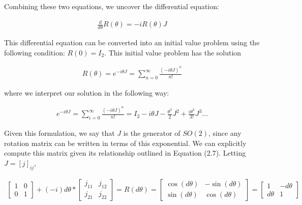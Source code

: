\documentclass[10pt]{ucthesis}
\begin{document}
Combining these two equations, we uncover the differential equation:

\begin{equation}
	\begin{aligned}
		\frac{d}{d\theta}R(\theta) = - i R(\theta)J
	\end{aligned}
\end{equation}  

This differential equation can be converted into an initial value problem using the following condition: $R(0) = I_2$. This initial value problem has the solution

\begin{equation}
	\begin{aligned}
		R(\theta) = e^{-i\theta J} = \sum_{n=0}^\infty \frac{(-i\theta J)^n}{n!}
	\end{aligned}
\end{equation}  

\noindent where we interpret our solution in the following way:

\begin{equation}
	\begin{aligned}
		e^{-i\theta J} = \sum_{i=0}^\infty \frac{\left(-i\theta J\right)^n}{n!} = I_2 -i\theta J - \frac{\theta^2}{2} J^2 + \frac{i\theta^3}{3!}J^3 \hdots 
	\end{aligned}
\end{equation}  

Given this formulation, we say that $J$ is the generator of $SO(2)$, since any rotation matrix can be written in terms of this exponential. We can explicitly compute this matrix given its relationship outlined in Equation (2.7). Letting $J = [j]_{ij}$,

\begin{equation}
	\begin{aligned}
		\begin{bmatrix}
			1 & 0 \\
			0 & 1
		\end{bmatrix} + (-i)d\theta * \begin{bmatrix}
			j_{11} & j_{12} \\
			j_{21} & j_{22}
		\end{bmatrix} = R(d\theta) = \begin{bmatrix}
			\cos(d\theta) & -\sin(d\theta) \\
			\sin(d\theta) & \cos(d\theta)
		\end{bmatrix} = 
		\begin{bmatrix}
			1 & -d\theta \\
			d\theta & 1
		\end{bmatrix}
	\end{aligned}
\end{equation}
\end{document}
